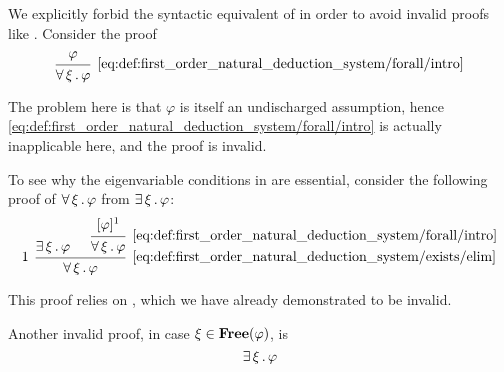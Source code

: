 \begin{example}\label{ex:def:first_order_natural_deduction_system/eigenvariables}
  \hfill
  \begin{thmenum}
     We explicitly forbid the syntactic equivalent of  in order to avoid invalid proofs like . Consider the proof
    \begin{equation*}
      \begin{prooftree}
        \hypo{ \varphi }
        \infer1[\ref{eq:def:first_order_natural_deduction_system/forall/intro}]{ \qforall \xi \varphi }
      \end{prooftree}
    \end{equation*}

    The problem here is that \( \varphi \) is itself an undischarged assumption, hence \eqref{eq:def:first_order_natural_deduction_system/forall/intro} is actually inapplicable here, and the proof is invalid.

     To see why the eigenvariable conditions in  are essential, consider the following proof of \( \forall \thinspace \xi \thinspace . \thinspace \varphi \) from \( \exists \thinspace \xi \thinspace . \thinspace \varphi \):
    \begin{equation*}
      \begin{prooftree}
        \hypo{ \qexists \xi \varphi }

        \hypo{ [\varphi]^1 }
        \infer1[\ref{eq:def:first_order_natural_deduction_system/forall/intro}]{ \qforall \xi \varphi }

        \infer[left label=\( 1 \)]2[\ref{eq:def:first_order_natural_deduction_system/exists/elim}]{ \qforall \xi \varphi }
      \end{prooftree}
    \end{equation*}

    This proof relies on , which we have already demonstrated to be invalid.

     Another invalid proof, in case \( \xi \in \operatorname{\mathbf{Free}}(\varphi) \), is
    \begin{equation*}
      \begin{prooftree}
        \hypo{ \qexists \xi \varphi }


\end{prooftree}
\end{equation*}
\end{thmenum}
\end{example}
